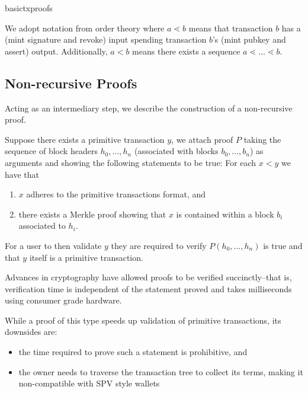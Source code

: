 \documentclass[9pt,oneside]{amsart}
\begin{document}
\begin{multicols}{2}
\begin{center}
    {basictxproofs}
\end{center}

We adopt notation from order theory where $a \lessdot b$ means that transaction $b$ has a (mint signature and revoke) input spending transaction $b$'s (mint pubkey and assert) output.  Additionally, $a < b$ means there exists a sequence $a \lessdot \dots \lessdot b$.
\subsection{Non-recursive Proofs}
Acting as an intermediary step, we describe the construction of a non-recursive proof.


Suppose there exists a primitive transaction $y$, we attach proof $P$ taking the sequence of block headers $h_{0}, \dots, h_{n}$ (associated with blocks $b_{0}, \dots, b_{n}$) as arguments and showing the following statements to be true:
For each $x < y$ we have that
\begin{enumerate}
    \item $x$ adheres to the primitive transactions format, and
    \item there exists a Merkle proof showing that $x$ is contained within a block $b_{i}$ associated to $h_{i}$.
\end{enumerate}

For a user to then validate $y$ they are required to verify $P(h_{0}, \dots, h_{n})$ is true and that $y$ itself is a primitive transaction.

Advances in cryptography have allowed proofs to be verified succinctly--that is, verification time is independent of the statement proved and takes milliseconds using consumer grade hardware.


While a proof of this type speeds up validation of primitive transactions, its downsides are:
\begin{itemize}
    \item the time required to prove such a statement is prohibitive, and
    \item the owner needs to traverse the transaction tree to collect its terms, making it non-compatible with SPV style wallets
\end{itemize}


\end{multicols}
\end{document}
